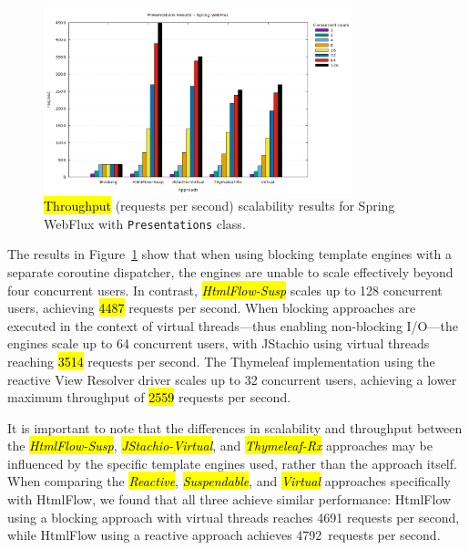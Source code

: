 \documentclass[software,article,accept,pdftex,moreauthors]{Definitions/mdpi}
\begin{document}
\begin{figure}[H]
\vspace{-6pt}
     \includegraphics[width=0.8\textwidth]{./Graphs/presentations-webflux-jmeter.png}
     \caption{\hl{Throughput} %
 (requests per second) scalability results for Spring WebFlux with \texttt{Presentations} class.}\label{fig:presentations-webflux-jmeter}
\end{figure}

The results in Figure~\ref{fig:presentations-webflux-jmeter} show that when
using blocking template engines with a separate coroutine dispatcher, the
engines are unable to scale effectively beyond four concurrent users. In contrast,
\textit{\hl{HtmlFlow-Susp}} scales up to 128 concurrent users, achieving \hl{4487} %
requests per second. When blocking approaches are executed in the context of
virtual threads---thus enabling non-blocking I/O---the engines scale up to 64
concurrent users, with JStachio using virtual threads reaching \hl{3514} requests
per second. The Thymeleaf implementation using the reactive View Resolver
driver scales up to 32 concurrent users, achieving a lower maximum throughput
of \hl{2559} requests per second.

It is important to note that the differences in scalability and throughput
between the \textit{\hl{HtmlFlow-Susp}}, \textit{\hl{JStachio-Virtual}}, and
\textit{\hl{Thymeleaf-Rx}} approaches may be influenced by the specific template
engines used, rather than the approach itself. When comparing the
\textit{\hl{Reactive}}, \textit{\hl{Suspendable}}, and \textit{\hl{Virtual}} approaches
specifically with HtmlFlow, we found that all three achieve similar
performance: HtmlFlow using a blocking approach with virtual threads reaches
4691 requests per second, while HtmlFlow using a reactive approach achieves
4792~requests per second.
\end{document}
